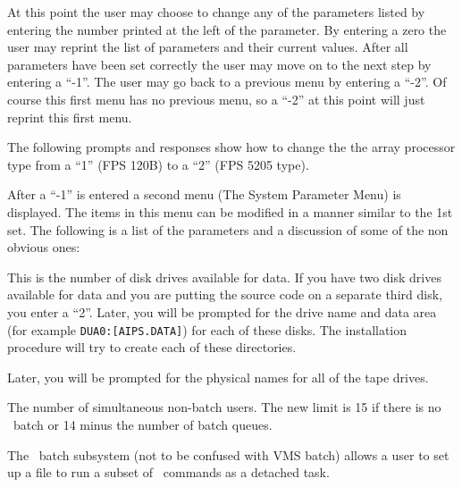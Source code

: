 At this point the user may choose to change any of the parameters
listed by entering the number printed at the left of the parameter.  By
entering a zero the user may reprint the list of parameters and their
current values.  After all parameters have been set correctly the user
may move on to the next step by entering a ``-1''.  The user may go back
to a previous menu by entering a ``-2''.  Of course this first menu has
no previous menu, so a ``-2''  at this point will just reprint this first
menu.

The following prompts and responses show how to change the the array
processor type from a ``1'' (FPS 120B) to a ``2'' (FPS 5205 type).
\medskip

\example{ }
\medskip

\noindent
After a ``-1'' is entered a second menu (The System Parameter Menu) is
displayed. The items in this menu can be modified in a manner similar
to the 1st set.  The following is a list of the parameters and a
discussion of some of the non obvious ones:\medskip

\medskip

\noindent
This is the number of disk drives available for data.  If you have two
disk drives available for data and you are putting the source code on a
separate third disk, you enter a ``2''.  Later, you will be prompted for
the drive name and data area (for example {\tt DUA0:[AIPS.DATA]}) for each of
these disks.  The installation procedure will try to create each of
these directories.\medskip

\medskip

\noindent
Later, you will be prompted for the physical names for all of the
tape drives.\medskip

\medskip

\noindent
The number of simultaneous non-batch users.  The new limit is 15
if there is no \aips\ batch or 14 minus the number of batch queues.
\medskip

\medskip

\noindent
The \aips\ batch subsystem (not to be confused with VMS batch) allows a
user to set up a file to run a subset of \aips\ commands as a detached
task.\medskip


